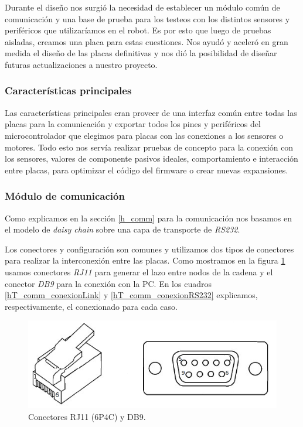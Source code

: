 Durante el dise\~no nos surgi\'o la necesidad de establecer un m\'odulo com\'un de comunicaci\'on y una base de prueba para
los testeos con los distintos sensores y perif\'ericos que utilizar\'iamos en el robot.
Es por esto que luego de pruebas aisladas, creamos una placa para estas cuestiones.
Nos ayud\'o y aceler\'o en gran medida el dise\~no de las placas definitivas y nos di\'o la posibilidad de dise\~nar futuras
actualizaciones a nuestro proyecto.

\subsubsection{Caracter\'isticas principales}
\label{h_placas_generica_caracteristicas}

Las caracter\'isticas principales eran proveer de una interfaz com\'un entre todas las placas para la comunicaci\'on y exportar
todos los pines y perif\'ericos del microcontrolador que elegimos para placas con las conexiones a los sensores o motores.
Todo esto nos serv\'ia realizar pruebas de concepto para la conexi\'on con los sensores, valores de componente pasivos ideales,
comportamiento e interacci\'on entre placas, para optimizar el c\'odigo del firmware o crear nuevas expansiones.

\subsubsection{M\'odulo de comunicaci\'on}
\label{h_placas_generica_comm}

Como explicamos en la secci\'on \ref{h_comm} para la comunicaci\'on nos basamos en el modelo de \emph{daisy chain} sobre una
capa de transporte de \emph{RS232}.

Los conectores y configuraci\'on son comunes y utilizamos dos tipos de conectores para realizar la interconexi\'on entre las placas.
Como mostramos en la figura \ref{hF_placa_gen_comm} usamos conectores \emph{RJ11} para generar el lazo entre nodos de la cadena y el
conector \emph{DB9} para la conexi\'on con la PC.
En los cuadros \ref{hT_comm_conexionLink} y \ref{hT_comm_conexionRS232} explicamos, respectivamente, el conexionado para cada caso.

\begin{figure}[ht]
	\centering
	\includegraphics[scale=.25]{rj11_db9.png}
	\caption{Conectores RJ11 (6P4C) y DB9.}
	\label{hF_placa_gen_comm}
\end{figure}

